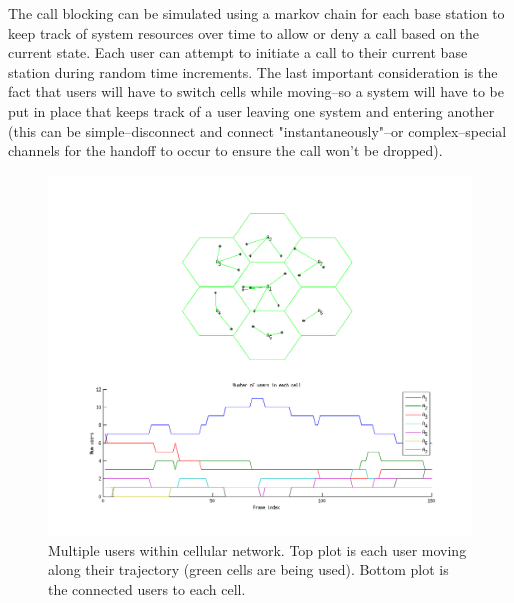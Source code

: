 \documentclass{article}
\begin{document}
The call blocking can be simulated using a markov chain for each base station to keep track of system resources over time to allow or deny a call based on the current state. Each user can attempt to initiate a call to their current base station during random time increments. The last important consideration is the fact that users will have to switch cells while moving--so a system will have to be put in place that keeps track of a user leaving one system and entering another (this can be simple--disconnect and connect "instantaneously"--or complex--special channels for the handoff to occur to ensure the call won't be dropped).\\

\begin{figure}[h]
\centerline{\includegraphics[width=5in]{doc/partB.png}}
\caption{Multiple users within cellular network. Top plot is each user moving along their trajectory (green cells are being used). Bottom plot is the connected users to each cell.}
\label{partb}
\end{figure}
\end{document}
